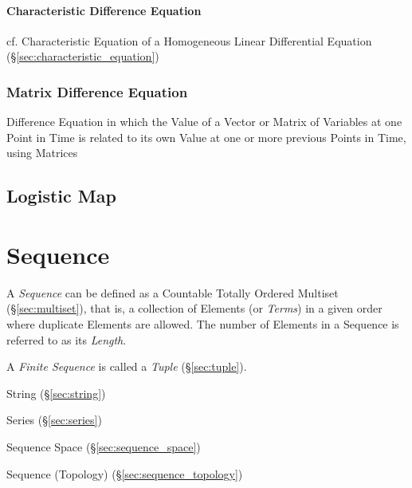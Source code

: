 \paragraph{Characteristic Difference Equation}
\label{sec:characteristic_difference_equation}\hfill

cf. Characteristic Equation of a Homogeneous Linear Differential Equation
(\S\ref{sec:characteristic_equation})



\subsubsection{Matrix Difference Equation}\label{sec:matrix_difference_equation}

Difference Equation in which the Value of a Vector or Matrix of Variables at
one Point in Time is related to its own Value at one or more previous Points in
Time, using Matrices



\subsection{Logistic Map}\label{sec:logistic_map}



\section{Sequence}\label{sec:sequence}

A \emph{Sequence} can be defined as a Countable Totally Ordered
Multiset (\S\ref{sec:multiset}), that is, a collection of Elements (or
\emph{Terms}) in a given order where duplicate Elements are allowed.
The number of Elements in a Sequence is referred to as its
\emph{Length}.

A \emph{Finite Sequence} is called a \emph{Tuple} (\S\ref{sec:tuple}).

String (\S\ref{sec:string})

Series (\S\ref{sec:series})

Sequence Space (\S\ref{sec:sequence_space})

Sequence (Topology) (\S\ref{sec:sequence_topology})

